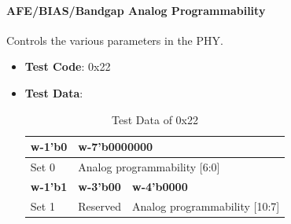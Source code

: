 \documentclass[main\_\_EN.tex]{subfiles}
\begin{document}
\paragraph{AFE/BIAS/Bandgap Analog Programmability}
\label{sec:test-code-0x22}
Controls the various parameters in the PHY.

\begin{itemize}
    \item \textbf{Test Code}: 0x22
    \item \textbf{Test Data}: 
        \begin{longtable}{ |p{2cm}|p{4cm}|p{6cm}| }
            \caption{Test Data of 0x22}
            \label{tab:test-data-0x22} \\
            \hline
            \rowcolor{lightgray}
            \textbf{w-1'b0} & \multicolumn{2}{l|}{\textbf{w-7'b0000000}} \\ \hline
            Set 0 & \multicolumn{2}{l|}{Analog programmability [6:0]}  \\ \hline
            \rowcolor{lightgray}
            \textbf{w-1'b1} & \textbf{w-3'b00} & \textbf{w-4'b0000} \\ \hline
            Set 1 & Reserved & Analog programmability [10:7]  \\ \hline
        \end{longtable}
        

\end{itemize}
\end{document}
